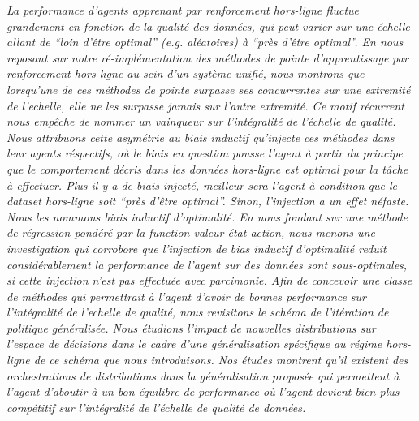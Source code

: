 \emph{%
La performance d'agents apprenant par renforcement hors-ligne fluctue grandement en fonction
de la qualité des données, qui peut varier
sur une échelle allant de
``loin d'être optimal'' (\textit{e.g.} aléatoires)
à ``près d'être optimal''.
En nous reposant sur notre ré-implémentation des méthodes de pointe d'apprentissage par
renforcement hors-ligne au sein d'un système unifié,
nous montrons que lorsqu'une de ces méthodes de pointe surpasse ses concurrentes
sur une extremité de l'echelle, elle ne les surpasse \emph{jamais} sur l'autre extremité.
Ce motif récurrent nous empêche de nommer un vainqueur sur l'intégralité de l'échelle de qualité.
Nous attribuons cette asymétrie au biais inductif qu'injecte ces méthodes dans leur agents
réspectifs, où le biais en question pousse l'agent à partir du principe que le
comportement décris dans les données hors-ligne est \emph{optimal} pour la tâche
à effectuer.
Plus il y a de biais injecté, meilleur sera l'agent \emph{à condition que}
le dataset hors-ligne soit ``près d'être optimal''.
Sinon, l'injection a un effet néfaste.
Nous les nommons biais inductif d'optimalité.
En nous fondant sur une méthode de régression pondéré par la function valeur état-action,
nous menons une investigation qui corrobore que l'injection de bias inductif d'optimalité
reduit considérablement la performance de l'agent sur des données sont sous-optimales,
si cette injection n'est pas effectuée avec parcimonie.
Afin de concevoir une classe de méthodes qui permettrait à l'agent d'avoir de bonnes
performance sur l'intégralité de l'echelle de qualité,
nous revisitons le schéma de l'itération de politique généralisée.
Nous étudions l'impact de nouvelles distributions sur l'espace de décisions
dans le cadre d'une généralisation spécifique au régime hors-ligne
de ce schéma que nous introduisons.
Nos études montrent qu'il existent des orchestrations de distributions dans la
généralisation proposée qui permettent à l'agent d'aboutir à un bon équilibre
de performance où l'agent devient bien plus
compétitif sur l'intégralité de l'échelle de qualité de données.
}
